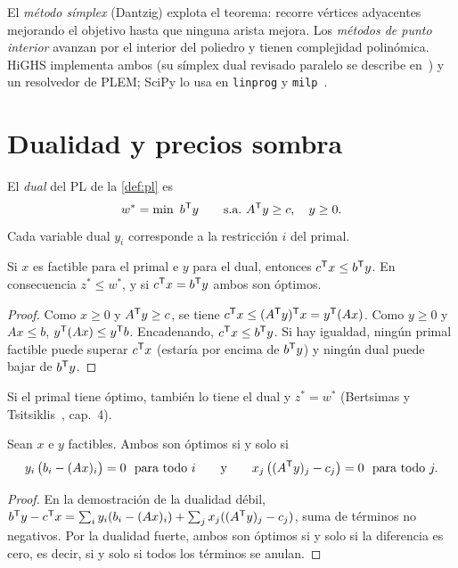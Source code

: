 El \emph{método símplex} (Dantzig) explota el teorema: recorre vértices adyacentes mejorando el objetivo hasta que ninguna arista mejora. Los \emph{métodos de punto interior} avanzan por el interior del poliedro y tienen complejidad polinómica. HiGHS implementa ambos (su símplex dual revisado paralelo se describe en~\cite{hh}) y un resolvedor de PLEM; SciPy lo usa en \texttt{linprog} y \texttt{milp}~\cite{highs}.

\section{Dualidad y precios sombra}

\begin{definicion}\label{def:dual}
El \emph{dual} del PL de la \cref{def:pl} es
\[
w^{*}=\min\ b^{\mathsf{T}} y\qquad\text{s.a.}\  A^{\mathsf{T}} y\ge c,\quad y\ge 0.
\]
Cada variable dual $y_i$ corresponde a la restricción $i$ del primal.
\end{definicion}

\begin{teorema}\label{teo:dual-debil}
Si $x$ es factible para el primal e $y$ para el dual, entonces $c^{\mathsf{T}} x\le b^{\mathsf{T}} y$. En consecuencia $z^{*}\le w^{*}$, y si $c^{\mathsf{T}} x=b^{\mathsf{T}} y$ ambos son óptimos.
\end{teorema}

\begin{proof}
Como $x\ge 0$ y $A^{\mathsf{T}} y\ge c$, se tiene $c^{\mathsf{T}} x\le (A^{\mathsf{T}} y)^{\mathsf{T}} x=y^{\mathsf{T}}(Ax)$. Como $y\ge 0$ y $Ax\le b$, $y^{\mathsf{T}}(Ax)\le y^{\mathsf{T}} b$. Encadenando, $c^{\mathsf{T}} x\le b^{\mathsf{T}} y$. Si hay igualdad, ningún primal factible puede superar $c^{\mathsf{T}} x$ (estaría por encima de $b^{\mathsf{T}} y$) y ningún dual puede bajar de $b^{\mathsf{T}} y$.
\end{proof}

\begin{teorema}\label{teo:dual-fuerte}
Si el primal tiene óptimo, también lo tiene el dual y $z^{*}=w^{*}$ (Bertsimas y Tsitsiklis~\cite{bt}, cap.~4).
\end{teorema}

\begin{corolario}\label{cor:holgura}
Sean $x$ e $y$ factibles. Ambos son óptimos si y solo si
\[
y_i\,\bigl(b_i-(Ax)_i\bigr)=0\ \ \text{para todo }i\qquad\text{y}\qquad x_j\,\bigl((A^{\mathsf{T}} y)_j-c_j\bigr)=0\ \ \text{para todo }j.
\]
\end{corolario}

\begin{proof}
En la demostración de la dualidad débil, $b^{\mathsf{T}} y-c^{\mathsf{T}} x=\sum_i y_i(b_i-(Ax)_i)+\sum_j x_j((A^{\mathsf{T}} y)_j-c_j)$, suma de términos no negativos. Por la dualidad fuerte, ambos son óptimos si y solo si la diferencia es cero, es decir, si y solo si todos los términos se anulan.
\end{proof}

